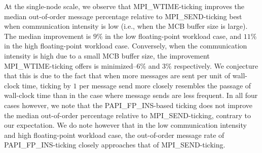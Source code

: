 At the single-node scale, we observe that MPI\_WTIME-ticking improves
the median out-of-order message percentage relative to
MPI\_SEND-ticking best when communication intensity is low (i.e., when
the MCB buffer size is large). The median improvement is $9\%$ in the
low floating-point workload case, and $11\%$ in the high
floating-point workload case. Conversely, when the communication
intensity is high due to a small MCB buffer size, the improvement
MPI\_WTIME-ticking offers is minimized--$6\%$ and $3\%$
respectively. We conjecture that this is due to the fact that when
more messages are sent per unit of wall-clock time, ticking by $1$ per
message send more closely resembles the passage of wall-clock time
than in the case where message sends are less frequent. In all four
cases however, we note that the PAPI\_FP\_INS-based ticking does not
improve the median out-of-order percentage relative to
MPI\_SEND-ticking, contrary to our expectation. We do note however
that in the low communication intensity and high floating-point
workload case, the out-of-order message rate of PAPI\_FP\_INS-ticking
closely approaches that of MPI\_SEND-ticking.

